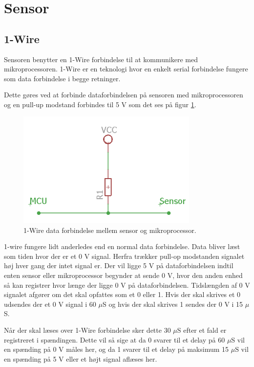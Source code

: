 \newpage
\section{Sensor}


\subsection{1-Wire}
Sensoren benytter en 1-Wire forbindelse til at kommunikere med mikroprocessoren. 1-Wire er en teknologi hvor en  enkelt serial forbindelse fungere som data forbindelse i begge retninger. 

Dette gøres ved at forbinde dataforbindelsen på sensoren med mikroprocessoren og en pull-up modstand forbindes til 5 V som det ses på figur \ref{one_wire_schematic}. 


\begin{figure}[h!]
  \centering
  \includegraphics[width=0.8\textwidth]{figures/onewire_eksempel.png}
  \caption{1-Wire data forbindelse mellem sensor og mikroprocessor.}
  \label{one_wire_schematic}
\end{figure}

1-wire fungere lidt anderledes end en normal data forbindelse. Data bliver læst som tiden hvor der er et 0 V signal. Herfra trækker pull-op modstanden signalet høj hver gang der intet signal er. Der vil ligge 5 V på dataforbindelsen indtil enten sensor eller mikroprocessor begynder at sende 0 V, hvor den anden enhed så kan registrer hvor længe der ligge 0 V på dataforbindelsen. Tidslængden af 0 V signalet afgører om det skal opfattes som et 0 eller 1. Hvis der skal skrives et 0 udsendes der et 0 V signal i 60 $\mu$S og hvis der skal skrives 1 sendes der 0 V i 15 $\mu$S. 

Når der skal læses over 1-Wire forbindelse sker dette 30 $\mu$S efter et fald er registreret i spændingen. Dette vil så sige at da 0 svarer til et delay på 60 $\mu$S vil en spænding på 0 V måles her, og da 1 svarer til et delay på maksimum 15 $\mu$S vil en spænding på 5 V eller et højt signal aflæses her.


